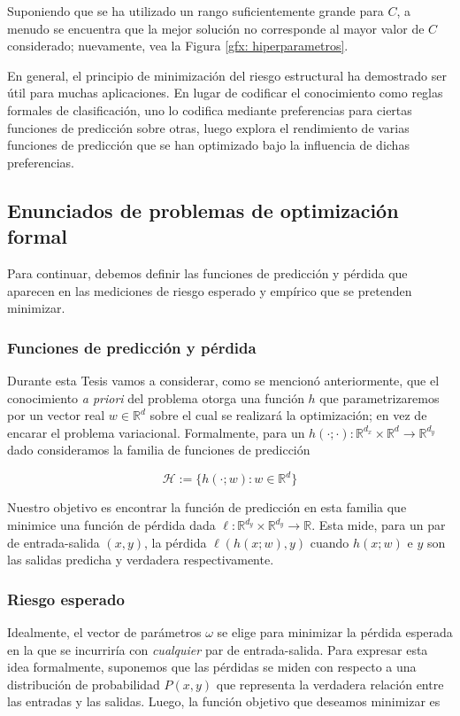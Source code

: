 Suponiendo que se ha utilizado un rango suficientemente grande para $C$, a menudo se encuentra que la mejor soluci\'on no corresponde al mayor valor de $C$ considerado; nuevamente, vea la Figura \ref{gfx: hiperparametros}.

En general, el principio de minimizaci\'on del riesgo estructural ha demostrado ser \'util para muchas aplicaciones. En lugar de codificar el conocimiento como reglas formales de clasificaci\'on, uno lo codifica mediante preferencias para ciertas funciones de predicci\'on sobre otras, luego explora el rendimiento de varias funciones de predicci\'on que se han optimizado bajo la influencia de dichas preferencias.

\subsection{Enunciados de problemas de optimizaci\'on formal}

Para continuar, debemos definir las funciones de predicci\'on y p\'erdida que aparecen en las mediciones de riesgo esperado y emp\'irico que se pretenden minimizar. 

\subsubsection{Funciones de predicci\'on y p\'erdida}
Durante esta Tesis vamos a considerar, como se mencion\'o anteriormente, que el conocimiento \textit{a priori} del problema otorga una funci\'on $h$ que parametrizaremos por un vector real $w \in \mathbb{R}^d $ sobre el cual se realizar\'a la optimizaci\'on; en vez de encarar el problema variacional. Formalmente, para un $h(\cdot ; \cdot): \mathbb{R}^{d_x} \times \mathbb{R}^d \rightarrow \mathbb{R}^{d_y}$ dado consideramos la familia de funciones de predicci\'on

\begin{equation}
\mathcal{H} := \lbrace h(\cdot ; w): w \in \mathbb{R}^d \rbrace
\end{equation}

Nuestro objetivo es encontrar la funci\'on de predicci\'on en esta familia que minimice una funci\'on de p\'erdida dada $ \ell : \mathbb{R}^{d_y} \times \mathbb{R}^{d_y} \rightarrow \mathbb{R}$. Esta mide, para un par de entrada-salida $(x, y)$, la p\'erdida $ \ell (h(x;w),y)$ cuando $h (x; w)$ e $y$ son las salidas predicha y verdadera respectivamente.

\subsubsection{Riesgo esperado}
Idealmente, el vector de par\'ametros $\omega$ se elige para minimizar la p\'erdida esperada en la que se incurrir\'ia con \textit{cualquier} par de entrada-salida. Para expresar esta idea formalmente, suponemos que las p\'erdidas se miden con respecto a una distribuci\'on de probabilidad $P (x, y)$ que representa la verdadera relaci\'on entre las entradas y las salidas. Luego, la funci\'on objetivo que deseamos minimizar es

